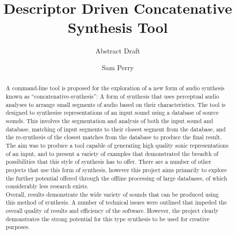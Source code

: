 \documentclass{scrartcl}
\begin{document}
    \title{Descriptor Driven Concatenative Synthesis Tool}
    \subtitle{\LARGE{Abstract Draft}}
    \author{Sam Perry}
    \date{}

    \maketitle


    \begin{abstract} 
    A command-line tool is proposed for the exploration of a new form of audio
    synthesis known as ``concatenative-synthesis'': A form of synthesis that uses
    perceptual audio analyses to arrange small segments of audio based on their
    characteristics.  The tool is designed to synthesise representations of an
    input sound using a database of source sounds. This involves the
    segmentation and analysis of both the input sound and database, matching of
    input segments to their closest segment from the database, and the
    re-synthesis of the closest matches from the database to produce the final
    result.\\

    The aim was to produce a tool capable of generating high quality sonic
    representations of an input, and to present a variety of examples that
    demonstrated the breadth of possibilities that this style of synthesis has
    to offer. There are a number of other projects that use this form of
    synthesis, however this project aims primarily to explore the further
    potential offered through the offline processing of large databases, of
    which considerably less research exists.\\

    Overall, results demonstrate the wide variety of sounds that can be
    produced using this method of synthesis. A number of technical issues were
    outlined that impeded the overall quality of results and efficiency of the
    software. However, the project clearly demonstrates the strong potential
    for this type synthesis to be used for creative purposes.
    \end{abstract}
\end{document}
